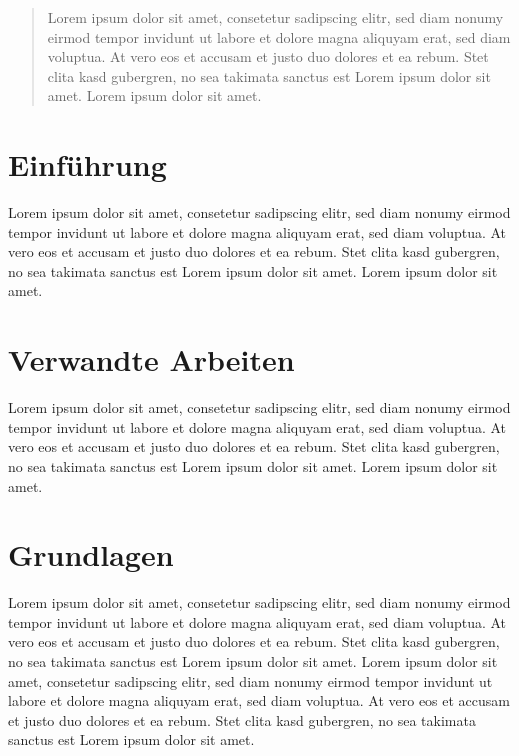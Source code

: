 \begin{abstract}
    Lorem ipsum dolor sit amet, consetetur sadipscing elitr, sed diam nonumy eirmod tempor invidunt ut labore et dolore magna aliquyam erat, sed diam voluptua. At vero eos et accusam et justo duo dolores et ea rebum. Stet clita kasd gubergren, no sea takimata sanctus est Lorem ipsum dolor sit amet. Lorem ipsum dolor sit amet.
\end{abstract}

\section{Einführung}

Lorem ipsum dolor sit amet, consetetur sadipscing elitr, sed diam nonumy eirmod tempor invidunt ut labore et dolore magna aliquyam erat, sed diam voluptua. At vero eos et accusam et justo duo dolores et ea rebum. Stet clita kasd gubergren, no sea takimata sanctus est Lorem ipsum dolor sit amet. Lorem ipsum dolor sit amet.


\section{Verwandte Arbeiten}

Lorem ipsum dolor sit amet, consetetur sadipscing elitr, sed diam nonumy eirmod tempor invidunt ut labore et dolore magna aliquyam erat, sed diam voluptua. At vero eos et accusam et justo duo dolores et ea rebum. Stet clita kasd gubergren, no sea takimata sanctus est Lorem ipsum dolor sit amet. Lorem ipsum dolor sit amet.


\section{Grundlagen}

Lorem ipsum dolor sit amet, consetetur sadipscing elitr, sed diam nonumy eirmod tempor invidunt ut labore et dolore magna aliquyam erat, sed diam voluptua. At vero eos et accusam et justo duo dolores et ea rebum. Stet clita kasd gubergren, no sea takimata sanctus est Lorem ipsum dolor sit amet. Lorem ipsum dolor sit amet, consetetur sadipscing elitr, sed diam nonumy eirmod tempor invidunt ut labore et dolore magna aliquyam erat, sed diam voluptua. At vero eos et accusam et justo duo dolores et ea rebum. Stet clita kasd gubergren, no sea takimata sanctus est Lorem ipsum dolor sit amet.

